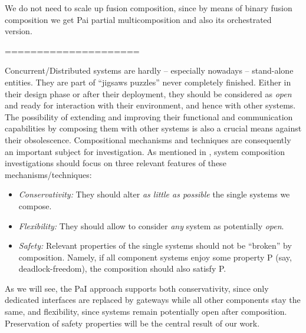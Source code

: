  
 We do not need to scale up fusion composition, since by means of binary fusion composition
 we get Pai partial multicomposition and also its orchestrated version. 
 
 
 =====================
 
 
 

Concurrent/Distributed systems are  hardly -- especially nowadays -- 
stand-alone entities. They are part of 
``jigsaws puzzles''  
never completely  finished.
Either in their design phase or after their deployment, they should be considered
as {\em open} and  ready for interaction with their environment, and hence with other systems. 
The possibility of extending and improving their functional and communication capabilities
by composing them
with other systems is also a crucial means %
against their obsolescence.
Compositional mechanisms and techniques are consequently an important subject for investigation.
As mentioned in \cite{BDGY23}, system composition investigations should focus on three relevant features
of these mechanisms/techniques:
\begin{itemize}
\item
{\em Conservativity:} 
They should alter {\em as little as possible} the single systems we compose.
\item
{\em Flexibility:} 
%
 They should allow to consider {\em any} system as potentially {\em open}.
\item
{\em Safety:}
Relevant properties of the single systems should not be ``broken'' by composition.
 Namely, if all component systems enjoy some property P (say, deadlock-freedom), the composition should also satisfy P. 
\end{itemize} 


As we will see, the PaI approach supports both conservativity, since only dedicated interfaces are replaced by gateways while all other components stay  the same,   %
and flexibility,  since systems remain potentially open after composition.
Preservation of safety properties will be the central result of our work.




